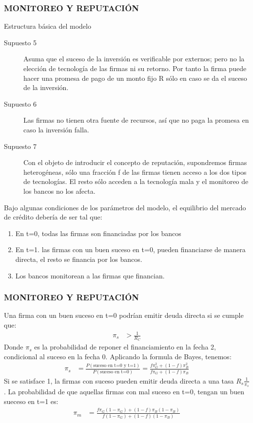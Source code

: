 \documentclass[10pt, xcolor=table, x11names]{beamer}
\begin{document}
\begin{frame}
    \frametitle{{\normalsize MONITOREO Y REPUTACIÓN} {}}
    
    \begin{block} {Estructura básica del modelo}
        \begin{description}
             \item[Supuesto 5] Asuma que el suceso de la inversión es verificable por externos; pero no la elección de tecnología de las firmas ni su retorno. Por tanto la firma puede hacer una promesa de pago de un monto fijo R sólo en caso se da el suceso de la inversión.
            \item[Supuesto 6] Las firmas no tienen otra fuente de recursos, así que no paga la promesa en caso la inversión falla.
           \item[Supuesto 7] Con el objeto de introducir el concepto de reputación, supondremos firmas heterogéneas, sólo una fracción f de las firmas tienen acceso a los dos tipos de tecnologías. El resto sólo acceden a la tecnología mala y el monitoreo de los bancos no los afecta. 
        \end{description}
          
    \end{block}	

    Bajo algunas condiciones de los parámetros del modelo, el equilibrio del mercado de crédito debería de ser tal que:
    \begin{enumerate}
        \item En t=0, todas las firmas son financiadas por los bancos
        \item En t=1. las firmas con un buen suceso en t=0, pueden financiarse de manera directa, el resto se financia por los bancos.
        \item Los bancos monitorean a las firmas que financian.
    \end{enumerate} 
\end{frame}

\begin{frame}
    \frametitle{{\normalsize MONITOREO Y REPUTACIÓN} {}}

 Una firma con un buen suceso en t=0 podrían emitir deuda directa si se cumple que:
 \begin{align}
 \pi_{s}&>\frac{1}{R_{C}}
 \end{align}
 Donde $\pi_{s} $ es la probabilidad de reponer el financiamiento en la fecha 2, condicional al suceso en la fecha 0. Aplicando la formula de Bayes, tenemos:
 \begin{align}
 \pi_{s}&=\frac{P(\mbox{suceso en t=0 y t=1})}{P(\mbox{suceso en t=0})}=\frac{f\pi_{G}^{2}+(1-f)\pi_{B}^{2}}{f\pi_{G}+(1-f)\pi_{B}}
 \end{align}
 Si se satisface 1, la firmas con suceso pueden emitir deuda directa
  a una tasa $R_{s}\frac{1}{\pi_{s}} $. La probabilidad de que aquellas firmas con mal suceso en t=0, tengan un buen sueceso en t=1 es:
 \begin{align}
 \pi_{m}&=\frac{f\pi_{G}(1-\pi_{G})+(1-f)\pi_{B}(1-\pi_{B})}{f(1-\pi_{G})+(1-f)(1-\pi_{B})}
 \end{align}
  
 \end{frame}
\end{document}
